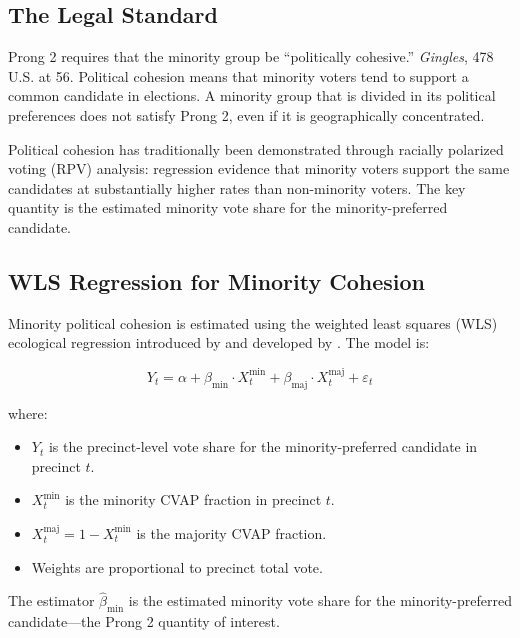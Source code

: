 \label{sec:prong2}

\subsection{The Legal Standard}

Prong 2 requires that the minority group be ``politically cohesive.''
\textit{Gingles}, 478 U.S. at 56.  Political cohesion means that minority
voters tend to support a common candidate in elections.  A minority group
that is divided in its political preferences does not satisfy Prong 2,
even if it is geographically concentrated.

Political cohesion has traditionally been demonstrated through racially
polarized voting (RPV) analysis: regression evidence that minority voters
support the same candidates at substantially higher rates than non-minority
voters.  The key quantity is the estimated minority vote share for the
minority-preferred candidate.

\subsection{WLS Regression for Minority Cohesion}

Minority political cohesion is estimated using the weighted least squares
(WLS) ecological regression introduced by \citet{goodman1953ecological} and
developed by \citet{king1997solution}.  The model is:

\begin{equation}
  Y_t = \alpha + \beta_{\text{min}} \cdot X^{\text{min}}_t
                + \beta_{\text{maj}} \cdot X^{\text{maj}}_t
                + \varepsilon_t
\end{equation}

where:
\begin{itemize}
  \item $Y_t$ is the precinct-level vote share for the minority-preferred
    candidate in precinct $t$.
  \item $X^{\text{min}}_t$ is the minority CVAP fraction in precinct $t$.
  \item $X^{\text{maj}}_t = 1 - X^{\text{min}}_t$ is the majority CVAP
    fraction.
  \item Weights are proportional to precinct total vote.
\end{itemize}

The estimator $\hat{\beta}_{\text{min}}$ is the estimated minority vote share
for the minority-preferred candidate---the Prong 2 quantity of interest.

